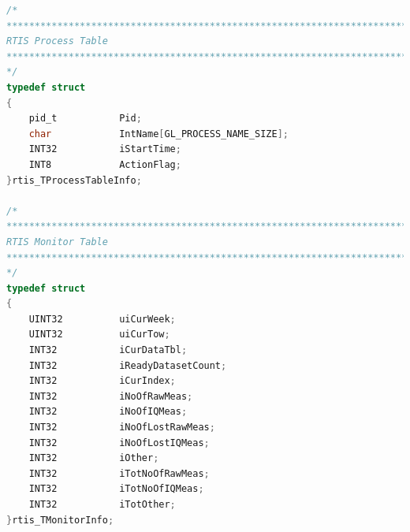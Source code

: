 \documentclass{themeensg}
\begin{document}
\newevenpage
\begin{appendices}
\label{beginappendices}

\label{SOW}


\label{structures}
\begin{lstlisting}[language=C]
/*
*******************************************************************************
RTIS Process Table
*******************************************************************************
*/
typedef struct
{
	pid_t 			Pid;
	char	 	   	IntName[GL_PROCESS_NAME_SIZE];
	INT32			iStartTime;
	INT8 			ActionFlag;
}rtis_TProcessTableInfo;

/*
*******************************************************************************
RTIS Monitor Table
*******************************************************************************
*/
typedef struct
{
	UINT32			uiCurWeek;
	UINT32			uiCurTow;
	INT32			iCurDataTbl;
	INT32			iReadyDatasetCount;
	INT32			iCurIndex;
	INT32			iNoOfRawMeas;
	INT32			iNoOfIQMeas;
	INT32			iNoOfLostRawMeas;
	INT32			iNoOfLostIQMeas;
	INT32			iOther;
	INT32			iTotNoOfRawMeas;
	INT32			iTotNoOfIQMeas;
	INT32			iTotOther;
}rtis_TMonitorInfo;\end{lstlisting}

\label{satref}


\label{configfile}



\end{appendices}
\end{document}
